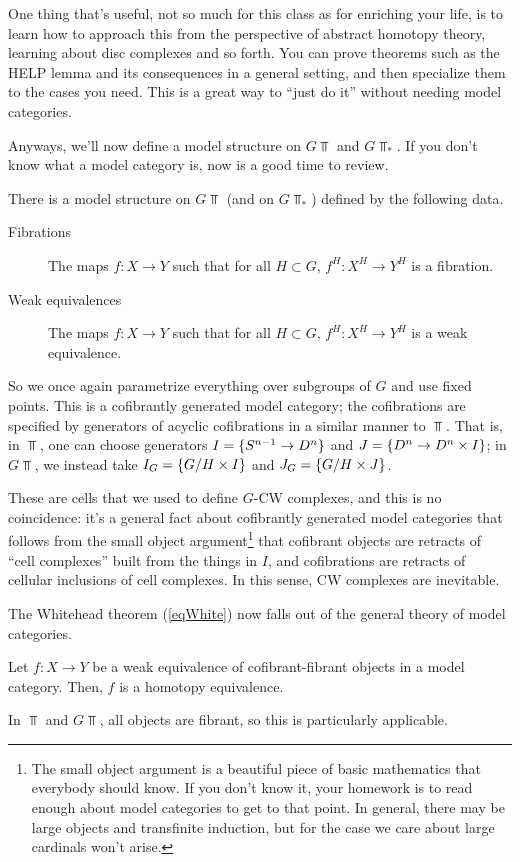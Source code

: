 One thing that's useful, not so much for this class as for enriching your life, is to learn how to approach this
from the perspective of abstract homotopy theory, learning about disc complexes and so forth. You can prove
theorems such as the HELP lemma and its consequences in a general setting, and then specialize them to the cases
you need. This is a great way to ``just do it'' without needing model categories.

Anyways, we'll now define a model structure on $G\Top$ and $G\Top_*$. If you don't know what a model category is,
now is a good time to review.
\begin{prop}
There is a model structure on $G\Top$ (and on $G\Top_*$) defined by the following data.
\begin{description}
	\item[Fibrations] The maps $f\colon X\to Y$ such that for all $H\subset G$, $f^H\colon X^H\to Y^H$ is a
	fibration.
	\item[Weak equivalences] The maps $f\colon X\to Y$ such that for all $H\subset G$, $f^H\colon X^H\to Y^H$ is a
	weak equivalence.
\end{description}
\end{prop}
So we once again parametrize everything over subgroups of $G$ and use fixed points. This is a cofibrantly generated
model category; the cofibrations are specified by generators of acyclic
cofibrations in a similar manner to $\Top$.  That is, in $\Top$, one can choose generators $I = \{S^{n-1}\to
D^n\}$ and $J = \{D^n\to D^n\times I\}$; in $G\Top$, we instead take $I_G = \{G/H\times I\}$ and $J_G =
\{G/H\times J\}$.

These are cells that we used to define $G$-CW complexes, and this is no coincidence: it's a general fact about
cofibrantly generated model categories that follows from the small object argument\footnote{The small object
argument is a beautiful piece of basic mathematics that everybody should know. If you don't know it, your homework
is to read enough about model categories to get to that point. In general, there may be large objects and
transfinite induction, but for the case we care about large cardinals won't arise.} that cofibrant objects are
retracts of ``cell complexes'' built from the things in $I$, and cofibrations are retracts of cellular inclusions
of cell complexes. In this sense, CW complexes are inevitable.

The Whitehead theorem (\cref{eqWhite}) now falls out of the general theory of model categories.
\begin{thm}
Let $f\colon X\to Y$ be a weak equivalence of cofibrant-fibrant objects in a model category. Then, $f$ is a
homotopy equivalence.
\end{thm}
In $\Top$ and $G\Top$, all objects are fibrant, so this is particularly applicable.
